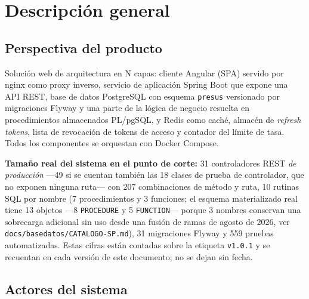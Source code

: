 \documentclass[11pt,a4paper]{article}
\begin{document}
\section{Descripción general}

\subsection{Perspectiva del producto}
Solución web de arquitectura en N capas: cliente Angular (SPA) servido por nginx como proxy
inverso, servicio de aplicación Spring Boot que expone una API REST, base de datos PostgreSQL
con esquema \texttt{presus} versionado por migraciones Flyway y una parte de la lógica de
negocio resuelta en procedimientos almacenados PL/pgSQL, y Redis como caché, almacén de
\emph{refresh tokens}, lista de revocación de tokens de acceso y contador del límite de tasa.
Todos los componentes se orquestan con Docker Compose.

\textbf{Tamaño real del sistema en el punto de corte:} 31 controladores REST \emph{de
producción} ---49 si se cuentan también las 18 clases de prueba de controlador, que no exponen
ninguna ruta--- con 207 combinaciones de método y ruta, 10 rutinas SQL por nombre (7 procedimientos
y 3 funciones; el esquema materializado real tiene 13 objetos ---8 \texttt{PROCEDURE} y 5
\texttt{FUNCTION}--- porque 3 nombres conservan una sobrecarga adicional sin uso desde una fusión de
ramas de agosto de 2026, ver \texttt{docs/basedatos/CATALOGO-SP.md}), 31 migraciones
Flyway y 559 pruebas automatizadas. Estas cifras están contadas sobre la etiqueta
\texttt{v1.0.1} y se recuentan en cada versión de este documento; no se dejan sin fecha.

\subsection{Actores del sistema}
\label{sec:actores}
\end{document}
